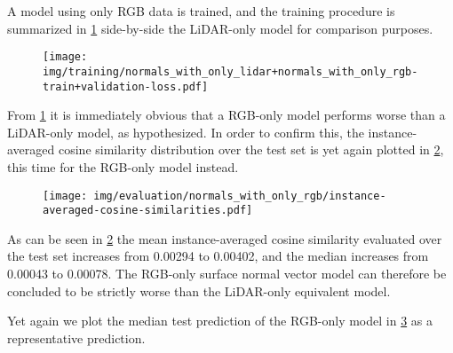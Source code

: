 A model using only RGB data is trained, and the training procedure is summarized in \cref{fig:rgb-training} side-by-side the LiDAR-only model for comparison purposes.
%
\begin{figure}[H]
  \texttt{[image: img/training/normals\_with\_only\_lidar+normals\_with\_only\_rgb-train+validation-loss.pdf]}
  \label{fig:rgb-training}
\end{figure}
\noindent
From \cref{fig:rgb-training} it is immediately obvious that a RGB-only model performs worse than a LiDAR-only model, as hypothesized.
In order to confirm this, the instance-averaged cosine similarity distribution over the test set is yet again plotted in \cref{fig:rgb-test-distribution}, this time for the RGB-only model instead.
%
\begin{figure}[H]
  \texttt{[image: img/evaluation/normals\_with\_only\_rgb/instance-averaged-cosine-similarities.pdf]}
  \label{fig:rgb-test-distribution}
\end{figure}
%
As can be seen in \cref{fig:rgb-test-distribution} the mean instance-averaged cosine similarity evaluated over the test set increases from \num{0.00294} to \num{0.00402}, and the median increases from \num{0.00043} to \num{0.00078}.
The RGB-only surface normal vector model can therefore be concluded to be strictly worse than the LiDAR-only equivalent model.

Yet again we plot the median test prediction of the RGB-only model in \cref{fig:rgb-median-prediction} as a representative prediction.
%
\begin{figure}[H]
  \label{fig:rgb-median-prediction}
\end{figure}

